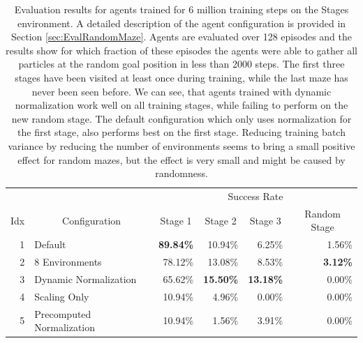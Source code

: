 \begin{table}[htp]
    \begin{center}
        \begin{tabular}{rlrrrr}
            \toprule
            & & \multicolumn{4}{c}{Success Rate} \\
            \cmidrule(lr){3-6}
            \multicolumn{1}{c}{Idx} & \multicolumn{1}{c}{Configuration} & \multicolumn{1}{c}{Stage 1} & \multicolumn{1}{c}{Stage 2} & \multicolumn{1}{c}{Stage 3} & \multicolumn{1}{c}{Random Stage} \\
            \midrule
            1 & Default & \textbf{89.84\%} & 10.94\% & 6.25\% & 1.56\% \\
            2 & 8 Environments & 78.12\% & 13.08\% & 8.53\% & \textbf{3.12\%} \\
            3 & Dynamic Normalization & 65.62\% & \textbf{15.50\%} & \textbf{13.18\%} & 0.00\% \\
            4 & Scaling Only & 10.94\% & 4.96\% & 0.00\% & 0.00\% \\
            5 & Precomputed Normalization & 10.94\% & 1.56\% & 3.91\% & 0.00\%\\
            \bottomrule
        \end{tabular}
        \caption[Evaluation Results for Agents trained on the Stages Environment]{Evaluation results for agents trained for 6 million training steps on the Stages environment. A detailed description of the agent configuration is provided in Section \ref{sec:EvalRandomMaze}. Agents are evaluated over 128 episodes and the results show for which fraction of these episodes the agents were able to gather all particles at the random goal position in less than 2000 steps. The first three stages have been visited at least once during training, while the last maze has never been seen before. We can see, that agents trained with dynamic normalization work well on all training stages, while failing to perform on the new random stage. The default configuration which only uses normalization for the first stage, also performs best on the first stage. Reducing training batch variance by reducing the number of environments seems to bring a small positive effect for random mazes, but the effect is very small and might be caused by randomness.} \label{tab:Eval/RandomMaze}
    \end{center}
\end{table}

